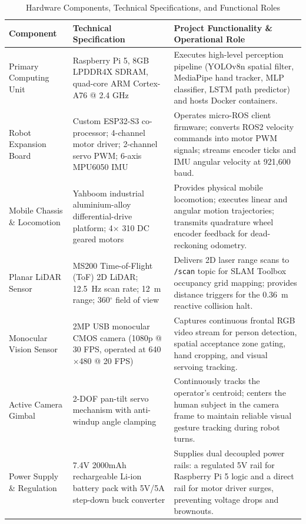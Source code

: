 \begin{table}[H]
\centering
\caption{Hardware Components, Technical Specifications, and Functional Roles}
\label{tab:hardware_requirements}
\renewcommand{\arraystretch}{1.15}
\begin{tabular}{|p{3.2cm}|p{4.8cm}|p{6.2cm}|}
\hline
\textbf{Component} & \textbf{Technical Specification} & \textbf{Project Functionality \& Operational Role} \\
\hline
Primary Computing Unit & Raspberry Pi 5, 8GB LPDDR4X SDRAM, quad-core ARM Cortex-A76 @ 2.4 GHz & Executes high-level perception pipeline (YOLOv8n spatial filter, MediaPipe hand tracker, MLP classifier, LSTM path predictor) and hosts Docker containers. \\
\hline
Robot Expansion Board & Custom ESP32-S3 co-processor; 4-channel motor driver; 2-channel servo PWM; 6-axis MPU6050 IMU & Operates micro-ROS client firmware; converts ROS2 velocity commands into motor PWM signals; streams encoder ticks and IMU angular velocity at 921,600 baud. \\
\hline
Mobile Chassis \& Locomotion & Yahboom industrial aluminium-alloy differential-drive platform; 4$\times$ 310 DC geared motors & Provides physical mobile locomotion; executes linear and angular motion trajectories; transmits quadrature wheel encoder feedback for dead-reckoning odometry. \\
\hline
Planar LiDAR Sensor & MS200 Time-of-Flight (ToF) 2D LiDAR; 12.5~Hz scan rate; 12~m range; 360$^\circ$ field of view & Delivers 2D laser range scans to \texttt{/scan} topic for SLAM Toolbox occupancy grid mapping; provides distance triggers for the 0.36~m reactive collision halt. \\
\hline
Monocular Vision Sensor & 2MP USB monocular CMOS camera (1080p @ 30 FPS, operated at 640$\times$480 @ 20 FPS) & Captures continuous frontal RGB video stream for person detection, spatial acceptance zone gating, hand cropping, and visual servoing tracking. \\
\hline
Active Camera Gimbal & 2-DOF pan-tilt servo mechanism with anti-windup angle clamping & Continuously tracks the operator's centroid; centers the human subject in the camera frame to maintain reliable visual gesture tracking during robot turns. \\
\hline
Power Supply \& Regulation & 7.4V 2000mAh rechargeable Li-ion battery pack with 5V/5A step-down buck converter & Supplies dual decoupled power rails: a regulated 5V rail for Raspberry Pi 5 logic and a direct rail for motor driver surges, preventing voltage drops and brownouts. \\
\hline
\end{tabular}
\end{table}

